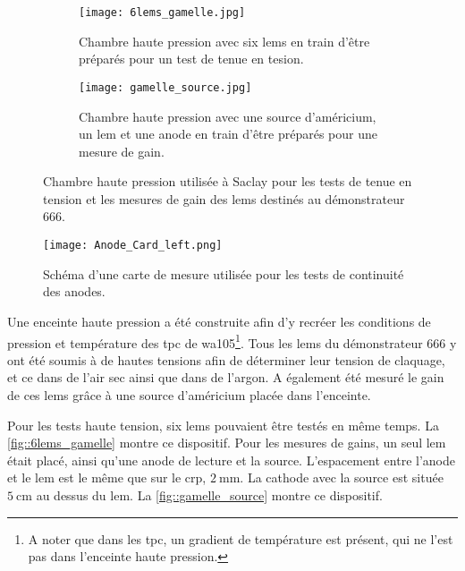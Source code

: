             \begin{figure}[htpb]
                \begin{subfigure}[t]{0.48\textwidth}
                    \texttt{[image: 6lems\_gamelle.jpg]}
                    \caption{Chambre haute pression avec six \glspl{lem} en train d'être préparés pour un test de tenue en tesion.}
                    \label{fig:6lems_gamelle}
                \end{subfigure}
                \hfill
                \begin{subfigure}[t]{0.48\textwidth}
                    \texttt{[image: gamelle\_source.jpg]}
                    \caption{Chambre haute pression avec une source d'américium, un \gls{lem} et une anode en train d'être préparés pour une mesure de gain.}
                    \label{fig:gamelle_source}
                \end{subfigure}
                \caption[Chambre haute pression]{Chambre haute pression utilisée à Saclay pour les tests de tenue en tension et les mesures de gain des \glspl{lem} destinés au démonstrateur 666.}
                \label{fig::gamelle}
            \end{figure}

            \begin{wrapfigure}{r}{0.1\textwidth}
                \texttt{[image: Anode\_Card\_left.png]}
                \caption[Schéma d'une carte de mesure utilisée pour les tests de continuité des anodes.]{Schéma d'une carte de mesure utilisée pour les tests de continuité des anodes.}
                \label{fig::Anode_Card_left}
            \end{wrapfigure}
            Une enceinte haute pression a été construite afin d'y recréer les conditions de pression et température des \gls{tpc} de \gls{wa105}\footnote{A noter que dans les \gls{tpc}, un gradient de température est présent, qui ne l'est pas dans l'enceinte haute pression.}. Tous les \glspl{lem} du démonstrateur 666 y ont été soumis à de hautes tensions afin de déterminer leur tension de claquage, et ce dans de l'air sec ainsi que dans de l'argon. A également été mesuré le gain de ces \glspl{lem} grâce à une source d'américium placée dans l'enceinte.
            
            Pour les tests haute tension, six \glspl{lem} pouvaient être testés en même temps. La \autoref{fig::6lems_gamelle} montre  ce dispositif. Pour les mesures de gains, un seul \gls{lem} était placé, ainsi qu'une anode de lecture et la source. L'espacement entre l'anode et le \gls{lem} est le même que sur le \gls{crp}, $\SI{2}{\milli\meter}$. La cathode avec la source est située $\SI{5}{\centi\meter}$ au dessus du \gls{lem}. La \autoref{fig::gamelle_source} montre ce dispositif.
        
